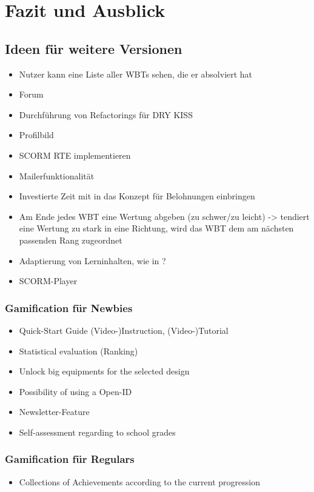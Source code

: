 \chapter{Fazit und Ausblick}\label{ref:chaptSummary}

\section{Ideen für weitere Versionen}\label{ref:weitereIdeen}
\begin{k}
\begin{itemize}
  \item Nutzer kann eine Liste aller WBTs sehen, die er absolviert hat
  \item Forum
  \item Durchführung von Refactorings für DRY KISS
  \item Profilbild
  \item SCORM RTE implementieren
  \item Mailerfunktionalität
  \item Investierte Zeit mit in das Konzept für Belohnungen einbringen
  \item Am Ende jedes WBT eine Wertung abgeben (zu schwer/zu leicht) -> tendiert
  eine Wertung zu stark in eine Richtung, wird das WBT dem am nächsten passenden
  Rang zugeordnet
  \item Adaptierung von Lerninhalten, wie in \cite{knall:2005}?
  \item SCORM-Player \cite{mitter:2005}
\end{itemize}

\subsection{Gamification für Newbies}
\begin{itemize}
    \item Quick-Start Guide (Video-)Instruction, (Video-)Tutorial
    \item Statistical evaluation (Ranking)
    \item Unlock big equipments for the selected design
    \item Possibility of using a Open-ID
    \item Newsletter-Feature
    \item Self-assessment regarding to school grades
  \end{itemize}
  
 \subsection{Gamification für Regulars}
 \begin{itemize}
    \item Collections of Achievements according to the current progression
  \end{itemize}
  

\end{k}

